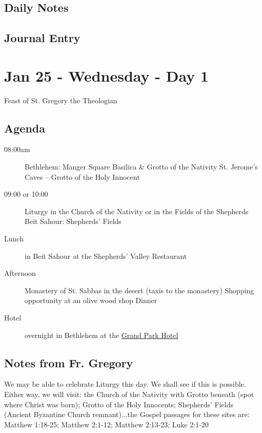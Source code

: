 \documentclass[letterpaper]{report}
\begin{document}
\clearpage
\subsection{Daily Notes}
\clearpage
\subsection{Journal Entry}

\clearpage
\section{Jan 25 - Wednesday - Day 1}
Feast of St. Gregory the Theologian

\subsection{Agenda}
\begin{description}
	\item[08:00am] Bethlehem: Manger Square
	    \subitem Basilica \& Grotto of the Nativity
	    \subitem St. Jerome's Caves – Grotto of the Holy Innocent
	\item[09:00 or 10:00] Liturgy in the Church of the Nativity or in the 
		Fields of the Shepherds
		\subitem Beit Sahour: Shepherds’ Fields
	\item[Lunch] in Beit Sahour at the Shepherds’ Valley Restaurant 
	\item[Afternoon] Monastery of St. Sabbas in the desert 
	    (taxis to the monastery)
	    \subitem Shopping opportunity at an olive wood shop Dinner 
	    
	\item[Hotel] overnight in Bethlehem at the
	  \href{http://www.grandpark.com/bethlehem/}{Grand Park Hotel}
\end{description}

\subsection{Notes from Fr. Gregory}
We may be able to celebrate Liturgy this day. We shall see if this is possible. Either way, we will visit: the Church of the Nativity with Grotto beneath (spot where Christ was born); Grotto of the Holy Innocents; Shepherds' Fields (Ancient Byzantine Church remnant)...the Gospel passages for these sites are: 
Matthew 1:18-25; Matthew 2:1-12; Matthew 2:13-23; Luke 2:1-20
\end{document}
